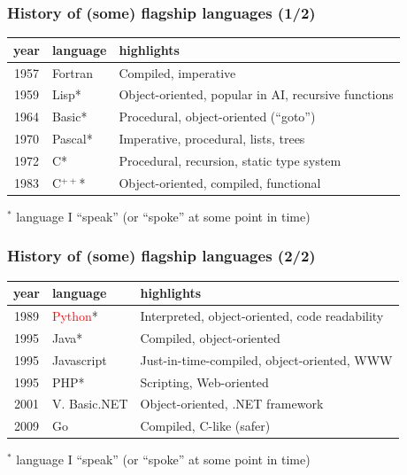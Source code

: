 \documentclass{beamer}
\newcommand{\red}[1]{\textcolor{red}{#1}}
\begin{document}
\begin{frame}
\frametitle{History of (some) flagship languages (1/2)}

\begin{center}
\begin{tabular}{clp{79mm}}
\hline
\bf year	& \bf language	& \bf highlights	\\
\hline
1957	& Fortran	& Compiled, imperative	\\
1959	& Lisp*		& Object-oriented, popular in AI, recursive functions	\\
1964	& Basic*	& Procedural, object-oriented (``goto'')	\\
1970	& Pascal*	& Imperative, procedural, lists, trees	\\
1972	& C*		& Procedural, recursion, static type system	\\
1983	& C$^{++}$*		& Object-oriented, compiled, functional	\\
\hline
\end{tabular}
\end{center}

\bigskip
$^*$ language I ``speak'' (or ``spoke'' at some point in time)
\end{frame}

\begin{frame}
\frametitle{History of (some) flagship languages (2/2)}

\begin{center}
\begin{tabular}{clp{79mm}}
\hline
\bf year	& \bf language	& \bf highlights	\\
\hline
1989	& \red{Python}*	& Interpreted, object-oriented, code readability	\\
1995	& Java*			& Compiled, object-oriented	\\
1995	& Javascript	&Just-in-time-compiled, object-oriented, WWW	\\
1995	& PHP*			& Scripting, Web-oriented	\\
2001	& V\@. Basic.NET	& Object-oriented, .NET framework	\\
2009	& Go			& Compiled, C-like (safer)	\\
\hline
\end{tabular}
\end{center}

\bigskip
$^*$ language I ``speak'' (or ``spoke'' at some point in time)
\end{frame}
\end{document}
